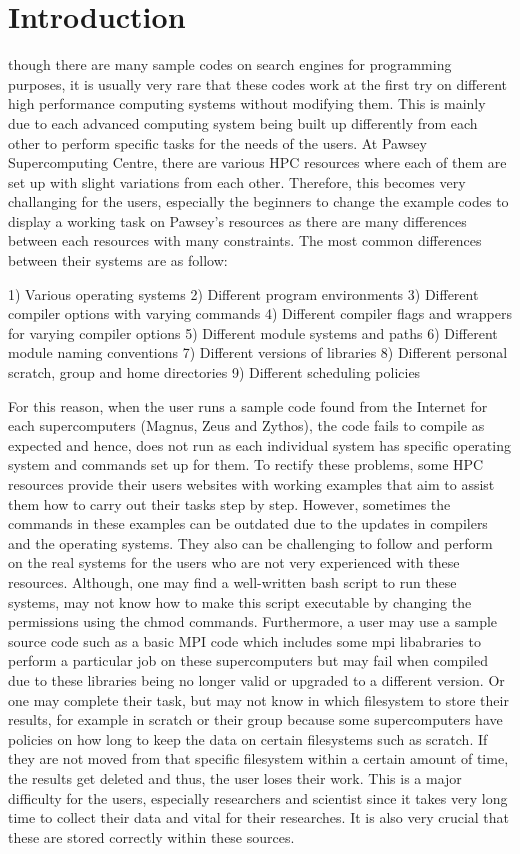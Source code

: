 \documentclass[journal]{IEEEtran}
\begin{document}
\section{Introduction}

 though there are many sample codes on search engines for programming purposes, it is usually very rare that these codes work at 
the first try on different high performance computing systems without modifying them. This is mainly due to each advanced computing system being built 
up differently from each other to perform specific tasks for the needs of the users. At Pawsey Supercomputing Centre, there are various HPC resources 
where each of them are set up with slight variations from each other. Therefore, this becomes very challanging for the users, especially the beginners 
to change the example codes to display a working task on Pawsey's resources as there are many differences between each resources with many constraints. 
The most common differences between their systems are as follow:

1) Various operating systems 
2) Different program environments
3) Different compiler options with varying commands
4) Different compiler flags and wrappers for varying compiler options
5) Different module systems and paths
6) Different module naming conventions
7) Different versions of libraries
8) Different personal scratch, group and home directories
9) Different scheduling policies

For this reason, when the user runs a sample code found from the Internet for each supercomputers (Magnus, Zeus and Zythos), the code fails to compile 
as expected and hence, does not run as each individual system has specific operating system and commands set up for them. To rectify these problems, 
some HPC resources provide their users websites with working examples that aim to assist them how to carry out their tasks step by step. 
However, sometimes the commands in these examples can be outdated due to the updates in compilers and the operating systems. They also can be challenging 
to follow and perform on the real systems for the users who are not very experienced with these resources. Although, one may find a well-written bash 
script to run these systems, may not know how to make this script executable by changing the permissions using the chmod commands. Furthermore, a user 
may use a sample source code such as a basic MPI code which includes some mpi libabraries to perform a particular job on these supercomputers but may 
fail when compiled due to these libraries being no longer valid or upgraded to a different version. Or one may complete their task, but may 
not know in which filesystem to store their results, for example in scratch or their group because some supercomputers have policies on how long to keep 
the data on certain filesystems such as scratch. If they are not moved from that specific filesystem within a certain amount of time, the results get 
deleted and thus, the user loses their work. This is a major difficulty for the users, especially researchers and scientist since it takes very long time 
to collect their data and vital for their researches. It is also very crucial that these are stored correctly within these sources.
\end{document}
